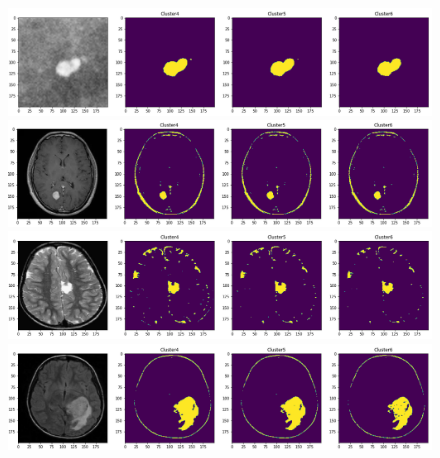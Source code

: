 \documentclass{article}
\begin{document}
\newpage

\begin{figure}[h!]
\centerline{\includegraphics[scale=0.45]{images/segmented_fuzzy_c_means_tumor0.png}}
\centerline{\includegraphics[scale=0.45]{images/segmented_fuzzy_c_means_tumor1.png}}
\centerline{\includegraphics[scale=0.45]{images/segmented_fuzzy_c_means_tumor2.png}}
\centerline{\includegraphics[scale=0.45]{images/segmented_fuzzy_c_means_tumor3.png}}
\end{figure}

\newpage
\end{document}
